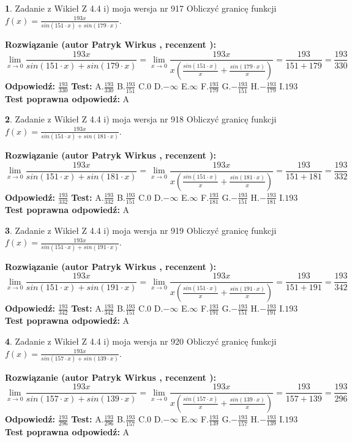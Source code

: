 \documentclass[12pt, a4paper]{article}
\theoremstyle{definition} %
\newtheorem{zad}{}
\newcommand{\zadStart}[1]{\begin{zad}#1\newline}
\newcommand{\zadStop}{\end{zad}}
\newcommand{\rozwStart}[2]{\noindent \textbf{Rozwiązanie (autor #1 , recenzent #2): }\newline}
\newcommand{\rozwStop}{\newline}
\newcommand{\odpStart}{\noindent \textbf{Odpowiedź:}\newline}
\newcommand{\odpStop}{\newline}
\newcommand{\testStart}{\noindent \textbf{Test:}\newline}
\newcommand{\testStop}{\newline}
\newcommand{\kluczStart}{\noindent \textbf{Test poprawna odpowiedź:}\newline}
\newcommand{\kluczStop}{\newline}
\begin{document}
\zadStart{Zadanie z Wikieł Z 4.4 i) moja wersja nr 917}
Obliczyć granicę funkcji $f(x)=\frac{193x}{sin(151\cdot x) +sin(179\cdot x)}$.
\zadStop
\rozwStart{Patryk Wirkus}{}
$$\lim\limits_{x\to 0}\frac{193x}{sin(151\cdot x) +sin(179\cdot x)}=\lim\limits_{x\to 0}\frac{193x}{x(\frac{sin(151\cdot x)}{x}+\frac{sin(179\cdot x)}{x})}=\frac{193}{151+179} = \frac{193}{330}$$
\rozwStop
\odpStart
$\frac{193}{330}$
\odpStop
\testStart
A.$\frac{193}{330}$
B.$\frac{193}{151}$
C.$0$
D.$-\infty$
E.$\infty$
F.$\frac{193}{179}$
G.$-\frac{193}{151}$
H.$-\frac{193}{179}$
I.$193$
\testStop
\kluczStart
A
\kluczStop



\zadStart{Zadanie z Wikieł Z 4.4 i) moja wersja nr 918}
Obliczyć granicę funkcji $f(x)=\frac{193x}{sin(151\cdot x) +sin(181\cdot x)}$.
\zadStop
\rozwStart{Patryk Wirkus}{}
$$\lim\limits_{x\to 0}\frac{193x}{sin(151\cdot x) +sin(181\cdot x)}=\lim\limits_{x\to 0}\frac{193x}{x(\frac{sin(151\cdot x)}{x}+\frac{sin(181\cdot x)}{x})}=\frac{193}{151+181} = \frac{193}{332}$$
\rozwStop
\odpStart
$\frac{193}{332}$
\odpStop
\testStart
A.$\frac{193}{332}$
B.$\frac{193}{151}$
C.$0$
D.$-\infty$
E.$\infty$
F.$\frac{193}{181}$
G.$-\frac{193}{151}$
H.$-\frac{193}{181}$
I.$193$
\testStop
\kluczStart
A
\kluczStop



\zadStart{Zadanie z Wikieł Z 4.4 i) moja wersja nr 919}
Obliczyć granicę funkcji $f(x)=\frac{193x}{sin(151\cdot x) +sin(191\cdot x)}$.
\zadStop
\rozwStart{Patryk Wirkus}{}
$$\lim\limits_{x\to 0}\frac{193x}{sin(151\cdot x) +sin(191\cdot x)}=\lim\limits_{x\to 0}\frac{193x}{x(\frac{sin(151\cdot x)}{x}+\frac{sin(191\cdot x)}{x})}=\frac{193}{151+191} = \frac{193}{342}$$
\rozwStop
\odpStart
$\frac{193}{342}$
\odpStop
\testStart
A.$\frac{193}{342}$
B.$\frac{193}{151}$
C.$0$
D.$-\infty$
E.$\infty$
F.$\frac{193}{191}$
G.$-\frac{193}{151}$
H.$-\frac{193}{191}$
I.$193$
\testStop
\kluczStart
A
\kluczStop



\zadStart{Zadanie z Wikieł Z 4.4 i) moja wersja nr 920}
Obliczyć granicę funkcji $f(x)=\frac{193x}{sin(157\cdot x) +sin(139\cdot x)}$.
\zadStop
\rozwStart{Patryk Wirkus}{}
$$\lim\limits_{x\to 0}\frac{193x}{sin(157\cdot x) +sin(139\cdot x)}=\lim\limits_{x\to 0}\frac{193x}{x(\frac{sin(157\cdot x)}{x}+\frac{sin(139\cdot x)}{x})}=\frac{193}{157+139} = \frac{193}{296}$$
\rozwStop
\odpStart
$\frac{193}{296}$
\odpStop
\testStart
A.$\frac{193}{296}$
B.$\frac{193}{157}$
C.$0$
D.$-\infty$
E.$\infty$
F.$\frac{193}{139}$
G.$-\frac{193}{157}$
H.$-\frac{193}{139}$
I.$193$
\testStop
\kluczStart
A
\kluczStop
\end{document}
